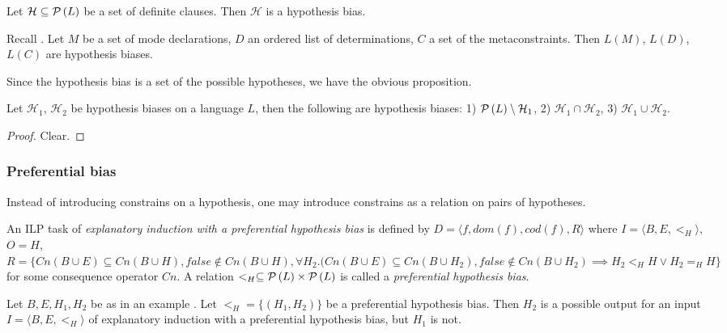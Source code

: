 \begin{exmp}
Let $\mathcal{H} \subseteq \mathcal{P} \left({ L }\right)$ be a set of definite clauses. Then $\mathcal{H}$ is a hypothesis bias.
\end{exmp}

\begin{exmp}
Recall .
Let $M$ be a set of mode declarations, $D$ an ordered list of determinations, $C$ a set of the metaconstraints.
Then $L(M)$, $L(D)$, $L(C)$ are hypothesis biases.
\end{exmp}

Since the hypothesis bias is a set of the possible hypotheses, we have the obvious proposition.
\begin{proposition}
Let $\mathcal{H}_1$, $\mathcal{H}_2$ be hypothesis biases on a language $L$, then the following are hypothesis biases:
1) $\mathcal{P} \left({ L }\right) \setminus \mathcal{H}_1$, 2) $\mathcal{H}_1 \cap \mathcal{H}_2$,
3) $\mathcal{H}_1 \cup \mathcal{H}_2$.
\end{proposition}

\begin{proof}
Clear.
\end{proof}

\subsubsection{Preferential bias}
Instead of introducing constrains on a hypothesis, one may introduce constrains as a relation on pairs of hypotheses.

\begin{defn}
An ILP task of \emph{explanatory induction with a preferential hypothesis bias} is defined by $D=\langle f, dom(f), cod(f), R \rangle$ where $I=\langle B, E, <_H\rangle$, $O=H$,
$R=\{Cn(B \cup E) \subseteq Cn(B \cup H), false \not\in Cn(B \cup H), \forall H_2. (Cn(B \cup E) \subseteq Cn(B \cup H_2), false \not\in Cn(B \cup H_2) \implies H_2 <_H H \lor H_2 =_H H \}$ for some consequence operator $Cn$. A relation $<_H \subseteq \mathcal{P} \left({ L }\right) \times \mathcal{P} \left({ L }\right)$ is called a \emph{preferential hypothesis bias}.
\end{defn}

\begin{exmp}
Let $B, E, H_1, H_2$ be as in an example .
Let $<_H=\{(H_1, H_2)\}$ be a preferential hypothesis bias.
Then $H_2$ is a possible output for an input $I=\langle B, E, <_H \rangle$ of explanatory induction with a preferential hypothesis bias, but $H_1$ is not.
\end{exmp}

